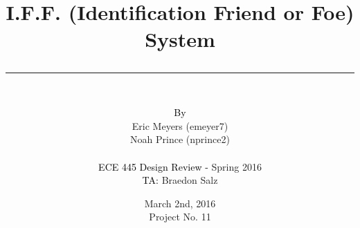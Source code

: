 \documentclass[letterpaper,10pt]{article}
\author{\vspace{.4in}\\
	\textcolor{black}{By}\\
	#1
	\vspace{1in}\\
	\textcolor{black}{ECE 445 Design Review -} #2\\
	\textcolor{black}{TA:} #3
	\vspace{1in}}
\newcommand{\thetitle}[1]{\title{\begin{huge}{\bf #1}\end{huge} \color{subtitlecolor}\rule[25pt]{\textwidth}{1pt}}}
\newcommand{\theauthor}[3]{
	\author{\vspace{.4in}\\
	\textcolor{black}{By}\\
	#1
	\vspace{1in}\\
	\textcolor{black}{ECE 445 Design Review -} #2\\
	\textcolor{black}{TA:} #3
	\vspace{1in}}
}
\begin{document}
\pagestyle{empty}
\doublespacing

\thetitle{{I.F.F. (Identification Friend or Foe) System}}

\theauthor{
	{Eric Meyers (emeyer7)}\\
	{Noah Prince (nprince2)}\\
}
{ %
	{Spring 2016}
}
{ %
	{Braedon Salz}
}

\date{
{March 2nd, 2016}\\
Project No. 11
\clearpage
}
\end{document}
